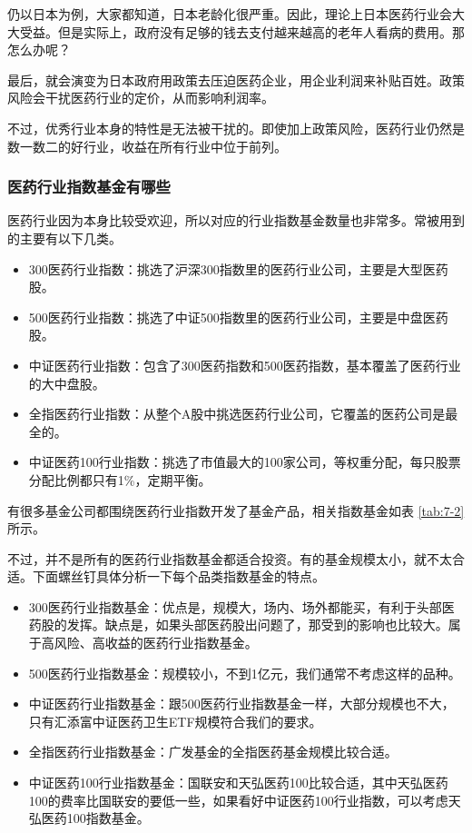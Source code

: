 仍以日本为例，大家都知道，日本老龄化很严重。因此，理论上日本医药行业会大大受益。但是实际上，政府没有足够的钱去支付越来越高的老年人看病的费用。那怎么办呢？

最后，就会演变为日本政府用政策去压迫医药企业，用企业利润来补贴百姓。政策风险会干扰医药行业的定价，从而影响利润率。

不过，优秀行业本身的特性是无法被干扰的。即使加上政策风险，医药行业仍然是数一数二的好行业，收益在所有行业中位于前列。

\subsubsection{医药行业指数基金有哪些}

医药行业因为本身比较受欢迎，所以对应的行业指数基金数量也非常多。常被用到的主要有以下几类。

\begin{itemize}
\item 300医药行业指数：挑选了沪深300指数里的医药行业公司，主要是大型医药股。
\item 500医药行业指数：挑选了中证500指数里的医药行业公司，主要是中盘医药股。
\item 中证医药行业指数：包含了300医药指数和500医药指数，基本覆盖了医药行业的大中盘股。
\item 全指医药行业指数：从整个A股中挑选医药行业公司，它覆盖的医药公司是最全的。
\item 中证医药100行业指数：挑选了市值最大的100家公司，等权重分配，每只股票分配比例都只有1\%，定期平衡。
\end{itemize}

有很多基金公司都围绕医药行业指数开发了基金产品，相关指数基金如表 \ref{tab:7-2} 所示。



不过，并不是所有的医药行业指数基金都适合投资。有的基金规模太小，就不太合适。下面螺丝钉具体分析一下每个品类指数基金的特点。

\begin{itemize}
\item 300医药行业指数基金：优点是，规模大，场内、场外都能买，有利于头部医药股的发挥。缺点是，如果头部医药股出问题了，那受到的影响也比较大。属于高风险、高收益的医药行业指数基金。
\item 500医药行业指数基金：规模较小，不到1亿元，我们通常不考虑这样的品种。
\item 中证医药行业指数基金：跟500医药行业指数基金一样，大部分规模也不大，只有汇添富中证医药卫生ETF规模符合我们的要求。
\item 全指医药行业指数基金：广发基金的全指医药基金规模比较合适。
\item 中证医药100行业指数基金：国联安和天弘医药100比较合适，其中天弘医药100的费率比国联安的要低一些，如果看好中证医药100行业指数，可以考虑天弘医药100指数基金。
\end{itemize}

